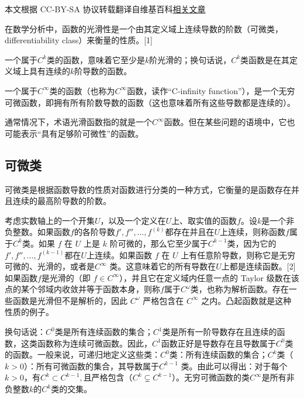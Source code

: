 
本文根据 CC-BY-SA 协议转载翻译自维基百科\href{https://en.wikipedia.org/wiki/Smoothness}{相关文章}

在数学分析中，函数的光滑性是一个由其定义域上连续导数的阶数（可微类，differentiability class）来衡量的性质。[1]

一个属于$C^k$类的函数，意味着它至少是$k$阶光滑的；换句话说，$C^k$类函数是在其定义域上具有连续的$k$阶导数的函数。

一个属于$C^\infty$类的函数（也称为$C^\infty$函数，读作“C-infinity function”），是一个无穷可微函数，即拥有所有阶数导数的函数（这也意味着所有这些导数都是连续的）。

通常情况下，术语光滑函数指的就是一个$C^\infty$函数。但在某些问题的语境中，它也可能表示“具有足够阶可微性”的函数。
\subsection{可微类}
可微类是根据函数导数的性质对函数进行分类的一种方式，它衡量的是函数存在并且连续的最高阶导数的阶数。

考虑实数轴上的一个开集$U$，以及一个定义在$U$上、取实值的函数$f$。设$k$是一个非负整数。如果函数$f$的各阶导数$f', f'', \dots, f^{(k)}$都存在并且在$U$上连续，则称函数$f$属于$C^k$类。如果 $f$ 在 $U$ 上是 $k$ 阶可微的，那么它至少属于$C^{k-1}$类，因为它的 $f', f'', \dots, f^{(k-1)}$都在$U$上连续。如果函数 $f$ 在 $U$ 上有任意阶导数，则称它是无穷可微的、光滑的，或者是$C^\infty$ 类。这意味着它的所有导数在$U$上都是连续函数。[2]如果函数$f$是光滑的（即 $f \in C^\infty$），并且它在定义域内任意一点的 Taylor 级数在该点的某个邻域内收敛并等于函数本身，则称$f$属于$C^\omega$类，也称为解析函数。存在一些函数是光滑但不是解析的，因此 $C^\omega$ 严格包含在 $C^\infty$ 之内。凸起函数就是这种性质的例子。

换句话说：$C^0$类是所有连续函数的集合；$C^1$类是所有一阶导数存在且连续的函数，这类函数称为连续可微函数。因此，$C^1$函数正好是导数存在且导数属于$C^0$类的函数。一般来说，可递归地定义这些类：$C^0$类：所有连续函数的集合；$C^k$类（$k>0$）：所有可微函数的集合，其导数属于$C^{k-1}$ 类。由此可以得出：对于每个$k>0$，有$C^k \subset C^{k-1},$且严格包含（$C^k \subsetneq C^{k-1}$）。无穷可微函数的类$C^\infty$是所有非负整数$k$的$C^k$类的交集。
